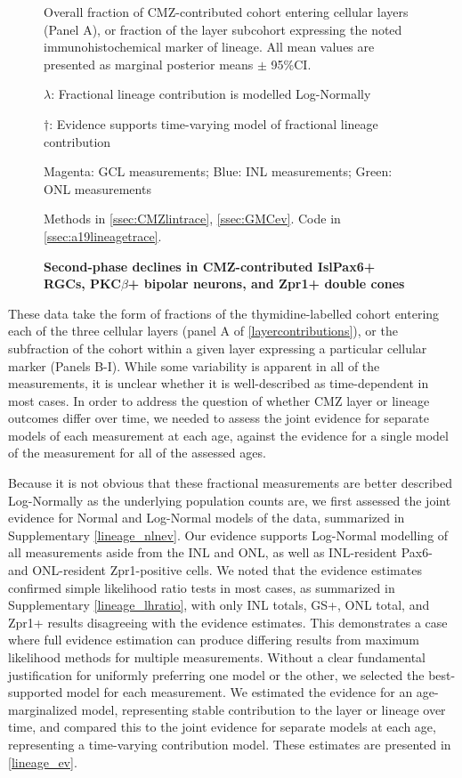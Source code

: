 \begin{figure}[!h]
    \caption{{\bf Second-phase declines in CMZ-contributed Isl\/Pax6+ RGCs, PKC$\beta$+ bipolar neurons, and Zpr1+ double cones}}
    Overall fraction of CMZ-contributed cohort entering cellular layers (Panel A), or fraction of the layer subcohort expressing the noted immunohistochemical marker of lineage. All mean values are presented as marginal posterior means $\pm$ 95\%CI.

    $\lambda$: Fractional lineage contribution is modelled Log-Normally

    $\dagger$: Evidence supports time-varying model of fractional lineage contribution

    Magenta: GCL measurements; Blue: INL measurements; Green: ONL measurements

    Methods in \autoref{ssec:CMZlintrace}, \autoref{ssec:GMCev}.
    Code in \autoref{ssec:a19lineagetrace}.    
    \label{layercontributions}
\end{figure}

These data take the form of fractions of the thymidine-labelled cohort entering each of the three cellular layers (panel A of \autoref{layercontributions}), or the subfraction of the cohort within a given layer expressing a particular cellular marker (Panels B-I). While some variability is apparent in all of the measurements, it is unclear whether it is well-described as time-dependent in most cases. In order to address the question of whether CMZ layer or lineage outcomes differ over time, we needed to assess the joint evidence for separate models of each measurement at each age, against the evidence for a single model of the measurement for all of the assessed ages. 

Because it is not obvious that these fractional measurements are better described Log-Normally as the underlying population counts are, we first assessed the joint evidence for Normal and Log-Normal models of the data, summarized in Supplementary \autoref{lineage_nlnev}. Our evidence supports Log-Normal modelling of all measurements aside from the INL and ONL, as well as INL-resident Pax6- and ONL-resident Zpr1-positive cells. We noted that the evidence estimates confirmed simple likelihood ratio tests in most cases, as summarized in Supplementary \autoref{lineage_lhratio}, with only INL totals, GS+, ONL total, and Zpr1+ results disagreeing with the evidence estimates. This demonstrates a case where full evidence estimation can produce differing results from maximum likelihood methods for multiple measurements.  Without a clear fundamental justification for uniformly preferring one model or the other, we selected the best-supported model for each measurement. We estimated the evidence for an age-marginalized model, representing stable contribution to the layer or lineage over time, and compared this to the joint evidence for separate models at each age, representing a time-varying contribution model. These estimates are presented in \autoref{lineage_ev}.


